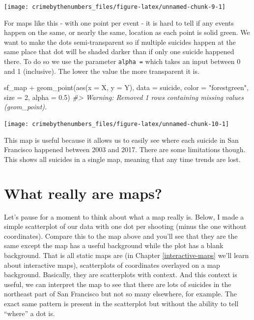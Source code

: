 \documentclass[
  12pt,
]{book}
\newenvironment{Shaded}{\begin{snugshade}}{\end{snugshade}}
\newcommand{\AttributeTok}[1]{\textcolor[rgb]{0.61,0.61,0.61}{#1}}
\newcommand{\CommentTok}[1]{\textcolor[rgb]{0.37,0.37,0.37}{\textit{#1}}}
\newcommand{\DecValTok}[1]{\textcolor[rgb]{0.06,0.06,0.06}{#1}}
\newcommand{\FloatTok}[1]{\textcolor[rgb]{0.06,0.06,0.06}{#1}}
\newcommand{\FunctionTok}[1]{\textcolor[rgb]{0,0,0}{#1}}
\newcommand{\NormalTok}[1]{#1}
\newcommand{\SpecialCharTok}[1]{\textcolor[rgb]{0,0,0}{#1}}
\newcommand{\StringTok}[1]{\textcolor[rgb]{0.5,0.5,0.5}{#1}}
\begin{document}
\begin{center}\texttt{[image: crimebythenumbers\_files/figure-latex/unnamed-chunk-9-1]} \end{center}

For maps like this - with one point per event - it is hard to tell if any events happen on the same, or nearly the same, location as each point is solid green. We want to make the dots semi-transparent so if multiple suicides happen at the same place that dot will be shaded darker than if only one suicide happened there. To do so we use the parameter \texttt{alpha\ =} which takes an input between 0 and 1 (inclusive). The lower the value the more transparent it is.

\begin{Shaded}
\begin{Highlighting}[]
\NormalTok{sf\_map }\SpecialCharTok{+}
  \FunctionTok{geom\_point}\NormalTok{(}\FunctionTok{aes}\NormalTok{(}\AttributeTok{x =}\NormalTok{ X, }\AttributeTok{y =}\NormalTok{ Y),}
             \AttributeTok{data  =}\NormalTok{ suicide,}
             \AttributeTok{color =} \StringTok{"forestgreen"}\NormalTok{,}
             \AttributeTok{size  =} \DecValTok{2}\NormalTok{,}
             \AttributeTok{alpha =} \FloatTok{0.5}\NormalTok{)}
\CommentTok{\#\textgreater{} Warning: Removed 1 rows containing missing values (geom\_point).}
\end{Highlighting}
\end{Shaded}

\begin{center}\texttt{[image: crimebythenumbers\_files/figure-latex/unnamed-chunk-10-1]} \end{center}

This map is useful because it allows us to easily see where each suicide in San Francisco happened between 2003 and 2017. There are some limitations though. This shows all suicides in a single map, meaning that any time trends are lost.

\hypertarget{what-really-are-maps}{%
\section{What really are maps?}\label{what-really-are-maps}}

Let's pause for a moment to think about what a map really is. Below, I made a simple scatterplot of our data with one dot per shooting (minus the one without coordinates). Compare this to the map above and you'll see that they are the same except the map has a useful background while the plot has a blank background. That is all static maps are (in Chapter \ref{interactive-maps} we'll learn about interactive maps), scatterplots of coordinates overlayed on a map background. Basically, they are scatterplots with context. And this context is useful, we can interpret the map to see that there are lots of suicides in the northeast part of San Francisco but not so many elsewhere, for example. The exact same pattern is present in the scatterplot but without the ability to tell ``where'' a dot is.
\end{document}
